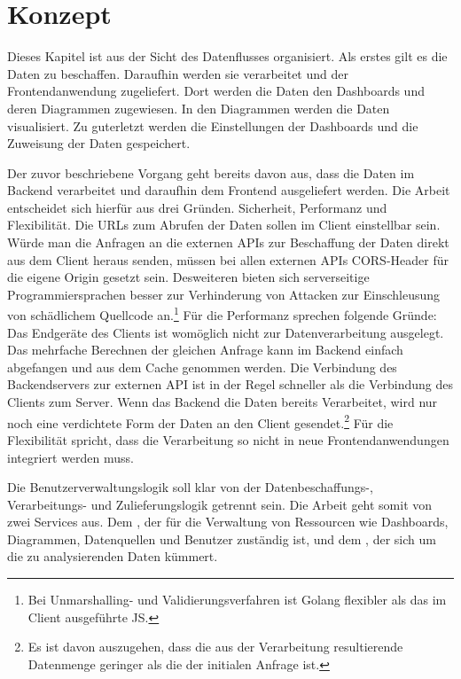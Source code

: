 \chapter{Konzept}
\label{chap:konzept}
\setcounter{footnote}{0}
Dieses Kapitel ist aus der Sicht des Datenflusses organisiert. Als erstes
gilt es die Daten zu beschaffen. Daraufhin werden sie verarbeitet und
der Frontendanwendung zugeliefert. Dort werden die Daten den Dashboards
und deren Diagrammen zugewiesen. In den Diagrammen werden die Daten
visualisiert. Zu guterletzt werden die Einstellungen der Dashboards
und die Zuweisung der Daten gespeichert.

Der zuvor beschriebene Vorgang geht bereits davon aus, dass die Daten im Backend
verarbeitet und daraufhin dem Frontend ausgeliefert werden. Die Arbeit entscheidet
sich hierfür aus drei Gründen. Sicherheit, Performanz und Flexibilität. Die URLs
zum Abrufen der Daten sollen im Client einstellbar sein. Würde man die Anfragen an
die externen APIs zur Beschaffung der Daten direkt aus dem Client heraus senden,
müssen bei allen externen APIs CORS-Header für die eigene Origin gesetzt sein\cite{CORSW3C}.
Desweiteren bieten sich serverseitige Programmiersprachen besser zur Verhinderung
von Attacken zur Einschleusung von schädlichem Quellcode an.\footnote{Bei
Unmarshalling- und Validierungsverfahren ist Golang flexibler als das im Client ausgeführte JS.}
Für die Performanz sprechen folgende Gründe: Das Endgeräte des Clients ist womöglich
nicht zur Datenverarbeitung ausgelegt. Das mehrfache Berechnen der gleichen Anfrage
kann im Backend einfach abgefangen und aus dem Cache genommen werden. Die Verbindung
des Backendservers zur externen API ist in der Regel schneller als die Verbindung
des Clients zum Server. Wenn das Backend die Daten bereits Verarbeitet, wird nur noch
eine verdichtete Form der Daten an den Client gesendet.\footnote{Es ist davon auszugehen, dass
die aus der Verarbeitung resultierende Datenmenge geringer als die der initialen Anfrage ist.}
Für die Flexibilität spricht, dass die Verarbeitung so nicht in neue Frontendanwendungen
integriert werden muss.

Die Benutzerverwaltungslogik soll klar von der Datenbeschaffungs-, Verarbeitungs-
und Zulieferungslogik getrennt sein. Die Arbeit geht somit von zwei Services aus.
Dem , der für die Verwaltung von Ressourcen wie Dashboards,
Diagrammen, Datenquellen und Benutzer zuständig ist, und dem ,
der sich um die zu analysierenden Daten kümmert.

